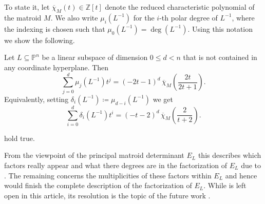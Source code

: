 \documentclass[12pt,a4paper,english]{scrartcl}
\newcommand{\ZZ}{\mathbb{Z}}
\newcommand{\PP}{\mathbb{P}}
\begin{document}
To state it, let $\overline{\chi}_{M}(t)\in \ZZ[t]$ denote the reduced characteristic polynomial of the matroid $M$. We also write $\mu_i(L^{-1})$ for the $i$-th polar degree of $L^{-1}$, where the indexing is chosen such that $\mu_0(L^{-1})=\deg(L^{-1})$. Using this notation we show the following.

\begin{maintheorem}\label{thm:intro:polardegrees}
Let $L\subseteq \PP^n$ be a linear subspace of dimension $0\leq d<n$ that is not contained in any coordinate hyperplane. Then
\[
\sum_{j = 0}^d \mu_j(L^{-1})t^j = (-2t-1)^d\, \overline{\chi}_M\left(\frac{2t}{2t+1}\right).
\]
Equivalently, setting $\delta_i(L^{-1}) \coloneq \mu_{d-i}(L^{-1})$ we get
\[
\sum_{i = 0}^d \delta_i(L^{-1})t^i = (-t-2)^{d} \, \overline{\chi}_M\left(\frac{2}{t+2}\right).
\]
\end{maintheorem}
\begin{corollary}\label{cor:introconjs}
     hold true.
\end{corollary}
From the viewpoint of the principal matroid determinant $E_L$ this describes which factors really appear and what there degrees are in the factorization of $E_L$ due to \cite[Theorem 1.2]{MatsubaraHeoTelen2026}. The remaining  concerns the multiplicities of these factors within $E_L$ and hence would finish the complete description of the factorization of $E_L$. While  is left open in this article, its resolution is the topic of the future work \cite{briand2025}.
\end{document}
